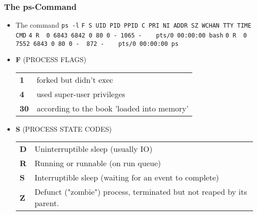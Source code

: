 \documentclass[hyperref={pdfpagelabels=false}]{beamer}
\newcommand{\code}[1]{\colorbox{lGray}{\texttt{#1}}}
\begin{document}
        \begin{frame}
            \frametitle{The ps-Command}
            \begin{itemize}
                \item<1-> The command \code{ps -l}
                \code{F S   UID   PID  PPID  C PRI  NI ADDR SZ WCHAN  TTY          TIME CMD}
                \code{4 R\ \ 0  6843  6842  0  80   0 -  1065 -  \ \ \  pts/0    00:00:00 bash}
                \code{0 R\ \ 0  7552  6843  0  80   0 -  \ 872 - \ \ \  pts/0    00:00:00 ps}
                \item<2-> \textbf{F} (PROCESS FLAGS)
                \begin{tabular}{ll}
                    \textbf{1}  & forked but didn't exec \\
                    \textbf{4}  & used super-user privileges \\
                    \textbf{30} & according to the book 'loaded into memory'
                \end{tabular}
                \item<3-> \textbf{S} (PROCESS STATE CODES)
                \begin{tabular}{ll}
                    \textbf{D} & Uninterruptible sleep (usually IO) \\
                    \textbf{R} & Running or runnable (on run queue) \\
                    \textbf{S} & Interruptible sleep (waiting for an event to complete) \\
                    \textbf{Z} & Defunct ("zombie") process, terminated but not reaped by its parent.
                \end{tabular}
            \end{itemize}
        \end{frame}
\end{document}
